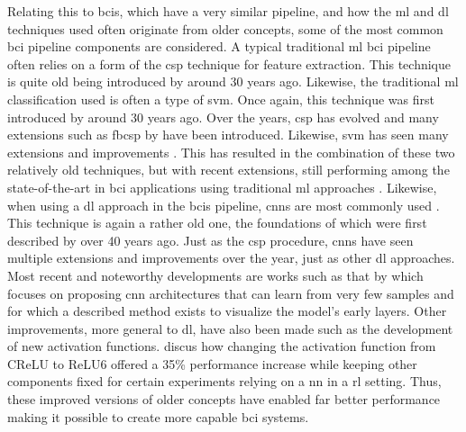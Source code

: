 Relating this to \glspl{bci}, which have a very similar pipeline, and how the \gls{ml} and \gls{dl} techniques used often originate from older concepts, some of the most common \gls{bci} pipeline components are considered.
A typical traditional \gls{ml} \gls{bci} pipeline often relies on a form of the \gls{csp} technique for feature extraction.
This technique is quite old being introduced by \citet{first_csp} around 30 years ago.
Likewise, the traditional \gls{ml} classification used is often a type of \gls{svm}.
Once again, this technique was first introduced by \citet{first_svm} around 30 years ago.
Over the years, \gls{csp} has evolved and many extensions such as \gls{fbcsp} by \citet{eeg_model_fbcsp} have been introduced.
Likewise, \gls{svm} has seen many extensions and improvements \citep{svm_extension1, svm_history}.
This has resulted in the combination of these two relatively old techniques, but with recent extensions, still performing among the state-of-the-art in \gls{bci} applications using traditional \gls{ml} approaches \citep{bci_competition_review, ml_strats_used_in_papers}.
Likewise, when using a \gls{dl} approach in the \glspl{bci} pipeline, \glspl{cnn} are most commonly used \citep{ml_strats_used_in_papers, bci_review_arnau}.
This technique is again a rather old one, the foundations of which were first described by \citet{first_cnn} over 40 years ago.
Just as the \gls{csp} procedure, \glspl{cnn} have seen multiple extensions and improvements over the year, just as other \gls{dl} approaches.
Most recent and noteworthy developments are works such as that by \citet{eeg_model_hbm} which focuses on proposing \gls{cnn} architectures that can learn from very few samples and for which a described method exists to visualize the model's early layers.
Other improvements, more general to \gls{dl}, have also been made such as the development of new activation functions.  discus how changing the activation function from CReLU to ReLU6 offered a 35\% performance increase while keeping other components fixed for certain experiments relying on a \gls{nn} in a \gls{rl} setting.
Thus, these improved versions of older concepts have enabled far better performance making it possible to create more capable \gls{bci} systems.

